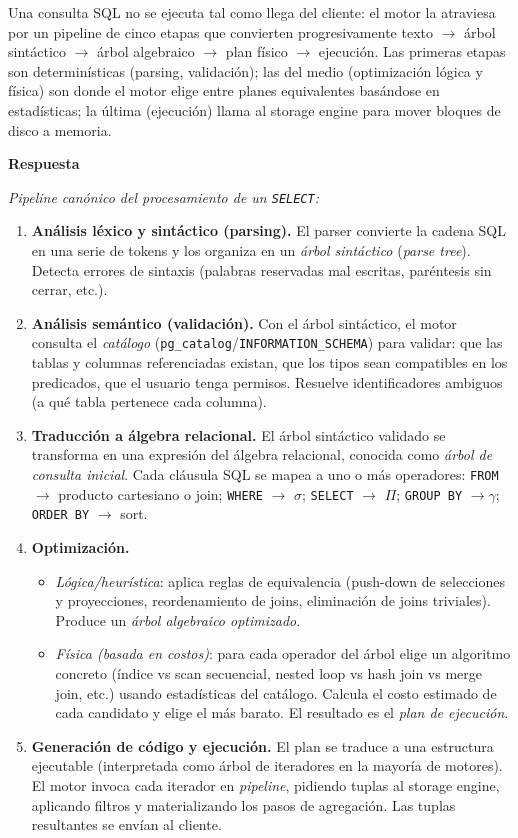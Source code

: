 \documentclass[11pt,a4paper]{article}
\newcommand{\itemcabecera}[1]{\noindent\textbf{#1}\par\medskip}
\newcommand{\bloqueRespuesta}{\itemcabecera{Respuesta}}
\begin{document}
Una consulta SQL no se ejecuta tal como llega del cliente: el motor la atraviesa por un pipeline de cinco etapas que convierten progresivamente texto $\to$ árbol sintáctico $\to$ árbol algebraico $\to$ plan físico $\to$ ejecución. Las primeras etapas son determinísticas (parsing, validación); las del medio (optimización lógica y física) son donde el motor elige entre planes equivalentes basándose en estadísticas; la última (ejecución) llama al storage engine para mover bloques de disco a memoria.

\bloqueRespuesta

\textit{Pipeline canónico del procesamiento de un \texttt{SELECT}:}

\begin{enumerate}
    \item \textbf{Análisis léxico y sintáctico (parsing).} El parser convierte la cadena SQL en una serie de tokens y los organiza en un \emph{árbol sintáctico} (\emph{parse tree}). Detecta errores de sintaxis (palabras reservadas mal escritas, paréntesis sin cerrar, etc.).
    \item \textbf{Análisis semántico (validación).} Con el árbol sintáctico, el motor consulta el \emph{catálogo} (\texttt{pg\_catalog}/\texttt{INFORMATION\_SCHEMA}) para validar: que las tablas y columnas referenciadas existan, que los tipos sean compatibles en los predicados, que el usuario tenga permisos. Resuelve identificadores ambiguos (a qué tabla pertenece cada columna).
    \item \textbf{Traducción a álgebra relacional.} El árbol sintáctico validado se transforma en una expresión del álgebra relacional, conocida como \emph{árbol de consulta inicial}. Cada cláusula SQL se mapea a uno o más operadores: \texttt{FROM} $\to$ producto cartesiano o join; \texttt{WHERE} $\to$ $\sigma$; \texttt{SELECT} $\to$ $\Pi$; \texttt{GROUP BY} $\to \gamma$; \texttt{ORDER BY} $\to$ sort.
    \item \textbf{Optimización.}
    \begin{itemize}
        \item \emph{Lógica/heurística}: aplica reglas de equivalencia (push-down de selecciones y proyecciones, reordenamiento de joins, eliminación de joins triviales). Produce un \emph{árbol algebraico optimizado}.
        \item \emph{Física (basada en costos)}: para cada operador del árbol elige un algoritmo concreto (índice vs scan secuencial, nested loop vs hash join vs merge join, etc.) usando estadísticas del catálogo. Calcula el costo estimado de cada candidato y elige el más barato. El resultado es el \emph{plan de ejecución}.
    \end{itemize}
    \item \textbf{Generación de código y ejecución.} El plan se traduce a una estructura ejecutable (interpretada como árbol de iteradores en la mayoría de motores). El motor invoca cada iterador en \emph{pipeline}, pidiendo tuplas al storage engine, aplicando filtros y materializando los pasos de agregación. Las tuplas resultantes se envían al cliente.
\end{enumerate}
\end{document}
